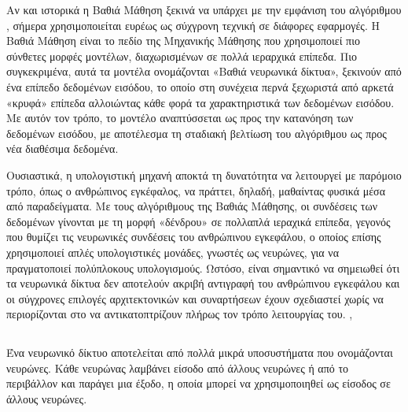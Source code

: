 {Αν και ιστορικά η Βαθιά Μάθηση ξεκινά να υπάρχει με την εμφάνιση του αλγόριθμου , σήμερα χρησιμοποιείται ευρέως ως σύχγρονη τεχνική σε διάφορες εφαρμογές. Η Βαθιά Μάθηση είναι το πεδίο της Μηχανικής Μάθησης που χρησιμοποιεί πιο σύνθετες μορφές μοντέλων, διαχωρισμένων σε πολλά ιεραρχικά επίπεδα. Πιο συγκεκριμένα, αυτά τα μοντέλα ονομάζονται «Βαθιά νευρωνικά δίκτυα», ξεκινούν από ένα επίπεδο δεδομένων εισόδου, το οποίο στη συνέχεια περνά ξεχωριστά από αρκετά «κρυφά» επίπεδα αλλοιώντας κάθε φορά τα χαρακτηριστικά των δεδομένων εισόδου. Με αυτόν τον τρόπο, το μοντέλο αναπτύσσεται ως προς την κατανόηση των δεδομένων εισόδου, με αποτέλεσμα τη σταδιακή βελτίωση του αλγόριθμου ως προς νέα διαθέσιμα δεδομένα. 

Ουσιαστικά, η υπολογιστική μηχανή αποκτά τη δυνατότητα να λειτουργεί με παρόμοιο τρόπο, όπως ο ανθρώπινος εγκέφαλος, να πράττει, δηλαδή, μαθαίντας φυσικά μέσα από παραδείγματα. Με τους αλγόριθμους της Βαθιάς Μάθησης, οι συνδέσεις των δεδομένων γίνονται με τη μορφή «δένδρου» σε πολλαπλά ιεραχικά επίπεδα, γεγονός που θυμίζει τις νευρωνικές συνδέσεις του ανθρώπινου εγκεφάλου, ο οποίος επίσης χρησιμοποιεί απλές υπολογιστικές μονάδες, γνωστές ως νευρώνες, για να πραγματοποιεί πολύπλοκους υπολογισμούς. Ωστόσο, είναι σημαντικό να σημειωθεί ότι τα νευρωνικά δίκτυα δεν αποτελούν ακριβή αντιγραφή του ανθρώπινου εγκεφάλου και οι σύγχρονες επιλογές αρχιτεκτονικών και συναρτήσεων έχουν σχεδιαστεί χωρίς να περιορίζονται στο να αντικατοπτρίζουν πλήρως τον τρόπο λειτουργίας του. \cite{3.5}, \cite{3.9}

\clearpage
\subsection{}
Ένα νευρωνικό δίκτυο αποτελείται από πολλά μικρά υποσυστήματα που ονομάζονται νευρώνες. Κάθε νευρώνας λαμβάνει είσοδο από άλλους νευρώνες ή από το περιβάλλον και παράγει μια έξοδο, η οποία μπορεί να χρησιμοποιηθεί ως είσοδος σε άλλους νευρώνες.

}
